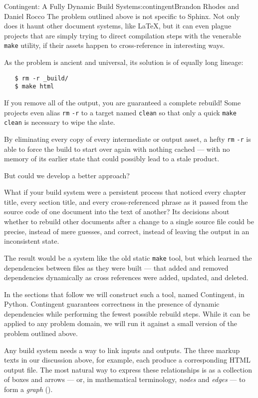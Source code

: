 \begin{aosachapter}{Contingent: A Fully Dynamic Build System}{s:contingent}{Brandon Rhodes and Daniel Rocco}
The problem outlined above is not specific to Sphinx. Not only does it
haunt other document systems, like LaTeX, but it can even plague
projects that are simply trying to direct compilation steps with the
venerable \texttt{make} utility, if their assets happen to
cross-reference in interesting ways.

As the problem is ancient and universal, its solution is of equally long
lineage:

\begin{verbatim}
   $ rm -r _build/
   $ make html
\end{verbatim}

If you remove all of the output, you are guaranteed a complete rebuild!
Some projects even alias \texttt{rm} \texttt{-r} to a target named
\texttt{clean} so that only a quick \texttt{make} \texttt{clean} is
necessary to wipe the slate.

By eliminating every copy of every intermediate or output asset, a hefty
\texttt{rm} \texttt{-r} is able to force the build to start over again
with nothing cached --- with no memory of its earlier state that could
possibly lead to a stale product.

But could we develop a better approach?

What if your build system were a persistent process that noticed every
chapter title, every section title, and every cross-referenced phrase as
it passed from the source code of one document into the text of another?
Its decisions about whether to rebuild other documents after a change to
a single source file could be precise, instead of mere guesses, and
correct, instead of leaving the output in an inconsistent state.

The result would be a system like the old static \texttt{make} tool, but
which learned the dependencies between files as they were built --- that
added and removed dependencies dynamically as cross references were
added, updated, and deleted.

In the sections that follow we will construct such a tool, named
Contingent, in Python. Contingent guarantees correctness in the presence
of dynamic dependencies while performing the fewest possible rebuild
steps. While it can be applied to any problem domain, we will run it
against a small version of the problem outlined above.

\label{linking-tasks-to-make-a-graph}

Any build system needs a way to link inputs and outputs. The three
markup texts in our discussion above, for example, each produce a
corresponding HTML output file. The most natural way to express these
relationships is as a collection of boxes and arrows --- or, in
mathematical terminology, \emph{nodes} and \emph{edges} --- to form a
\emph{graph} ().


\end{aosachapter}
